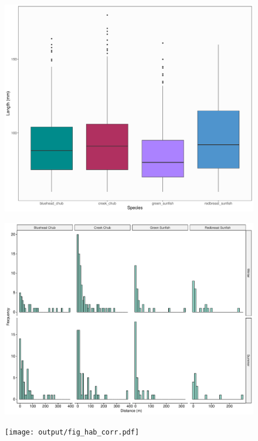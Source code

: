 \documentclass[11pt, class=article, crop=false]{standalone}
\begin{document}
\newpage

\begin{figure}
    \centering
    \includegraphics[width=0.8\linewidth]{output/fig_size_dist.pdf}
    \caption{}
    \label{fig:fig_size_dist}
\end{figure}

\newpage

\begin{figure}
    \centering
    \includegraphics[width=0.8\linewidth]{output/fig_total_movement.pdf}
    \caption{}
    \label{fig:fig_tot_move}
\end{figure}

\newpage

\begin{figure}
    \centering
    \texttt{[image: output/fig\_hab\_corr.pdf]}
    \caption{}
    \label{fig:fig_hab_corr}
\end{figure}

\newpage
\end{document}
